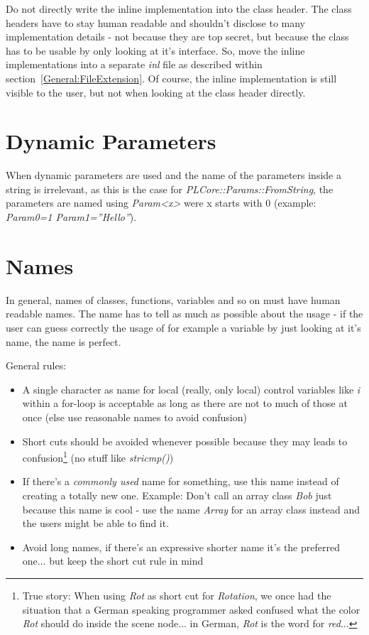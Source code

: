 Do not directly write the inline implementation into the class header. The class headers have to stay human readable and shouldn't disclose to many implementation details - not because they are top secret, but because the class has to be usable by only looking at it's interface. So, move the inline implementations into a separate \emph{inl} file as described within section~\ref{General:FileExtension}. Of course, the inline implementation is still visible to the user, but not when looking at the class header directly.




\section{Dynamic Parameters}
When dynamic parameters are used and the name of the parameters inside a string is irrelevant, as this is the case for \emph{PLCore::Params::FromString}, the parameters are named using \emph{Param<x>} were x starts with $0$ (example: \emph{Param0=1 Param1=''Hello''}).  




\section{Names}
In general, names of classes, functions, variables and so on must have human readable names. The name has to tell as much as possible about the usage - if the user can guess correctly the usage of for example a variable by just looking at it's name, the name is perfect.

General rules:

\begin{itemize}
\item A single character as name for local (really, only local) control variables like \emph{i} within a for-loop is acceptable as long as there are not to much of those at once (else use reasonable names to avoid confusion)
\item Short cuts should be avoided whenever possible because they may leads to confusion\footnote{True story: When using \emph{Rot} as short cut for \emph{Rotation}, we once had the situation that a German speaking programmer asked confused what the color \emph{Rot} should do inside the scene node... in German, \emph{Rot} is the word for \emph{red}...} (no stuff like \emph{stricmp()})
\item If there's a \emph{commonly used} name for something, use this name instead of creating a totally new one. Example: Don't call an array class \emph{Bob} just because this name is cool - use the name \emph{Array} for an array class instead and the users might be able to find it.
\item Avoid long names, if there's an expressive shorter name it's the preferred one... but keep the short cut rule in mind
\end{itemize}

